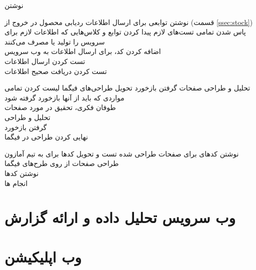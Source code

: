 \begin{wbsbox}{نوشتن }
\begin{wbssub}
{نوشتن توابعی برای ارسال اطلاعات ردیابی محصول در خروج از  (قسمت \ref{ssec:stock}\hspace{1mm})}
{پاس شدن تمامی تست‌های لازم}
پیدا کردن توابع و کلاس‌هایی که اطلاعات لازم برای سرویس را تولید یا مصرف می‌کنند \\
\task 
اضافه کردن کد، برای ارسال اطلاعات به وب ‌سرویس \\
\task
تست کردن ارسال اطلاعات \\
\task
تست کردن دریافت صحیح اطلاعات
\end{wbssub}

\begin{wbssub}
{تحلیل و طراحی صفحات گرفتن بازخورد}
{تحویل طراحی‌‌های فیگما}
\task
لیست کردن تمامی مواردی که باید از آنها بازخورد گرفته شود \\
\task
طوفان فکری،‌ تحقیق در مورد صفحات \\
\task
تحلیل و طراحی \\
\task
گرفتن بازخورد \\
\task
نهایی کردن طراحی در فیگما
\end{wbssub}

\begin{wbssub}
{نوشتن کد‌های  برای صفحات طراحی شده}
{تست و تحویل کد‌ها برای به تیم  آمازون}
\task
طراحی صفحات از روی طرح‌های فیگما \\
\task
نوشتن کد‌ها \\
\task
انجام ‌ها \\
\end{wbssub}
\end{wbsbox}

\section{وب سرویس تحلیل داده و ارائه گزارش}

\section{وب اپلیکیشن}